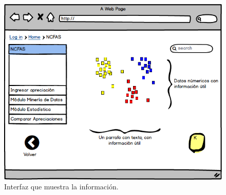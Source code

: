 \begin{figure}[h!]
	\label{min}
	\begin{center}
		\includegraphics[scale=0.4]{imagenes/min.png}
	\end{center}
	\caption{Interfaz que muestra la información.}
\end{figure}

